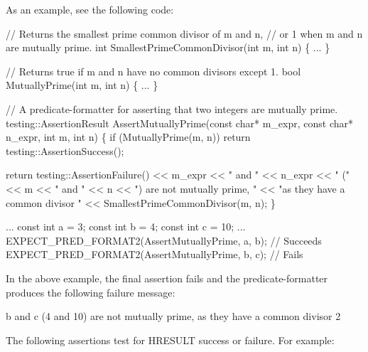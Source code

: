 As an example, see the following code\+:


\begin{DoxyCode}
\textcolor{comment}{// Returns the smallest prime common divisor of m and n,}
\textcolor{comment}{// or 1 when m and n are mutually prime.}
\textcolor{keywordtype}{int} SmallestPrimeCommonDivisor(\textcolor{keywordtype}{int} m, \textcolor{keywordtype}{int} n) \{ ... \}

\textcolor{comment}{// Returns true if m and n have no common divisors except 1.}
\textcolor{keywordtype}{bool} MutuallyPrime(\textcolor{keywordtype}{int} m, \textcolor{keywordtype}{int} n) \{ ... \}

\textcolor{comment}{// A predicate-formatter for asserting that two integers are mutually prime.}
testing::AssertionResult AssertMutuallyPrime(\textcolor{keyword}{const} \textcolor{keywordtype}{char}* m\_expr,
                                             \textcolor{keyword}{const} \textcolor{keywordtype}{char}* n\_expr,
                                             \textcolor{keywordtype}{int} m,
                                             \textcolor{keywordtype}{int} n) \{
  \textcolor{keywordflow}{if} (MutuallyPrime(m, n)) \textcolor{keywordflow}{return} testing::AssertionSuccess();

  \textcolor{keywordflow}{return} testing::AssertionFailure() << m\_expr << \textcolor{stringliteral}{" and "} << n\_expr
      << \textcolor{stringliteral}{" ("} << m << \textcolor{stringliteral}{" and "} << n << \textcolor{stringliteral}{") are not mutually prime, "}
      << \textcolor{stringliteral}{"as they have a common divisor "} << SmallestPrimeCommonDivisor(m, n);
\}

...
const \textcolor{keywordtype}{int} a = 3;
\textcolor{keyword}{const} \textcolor{keywordtype}{int} b = 4;
\textcolor{keyword}{const} \textcolor{keywordtype}{int} c = 10;
...
EXPECT\_PRED\_FORMAT2(AssertMutuallyPrime, a, b);  \textcolor{comment}{// Succeeds}
EXPECT\_PRED\_FORMAT2(AssertMutuallyPrime, b, c);  \textcolor{comment}{// Fails}
\end{DoxyCode}


In the above example, the final assertion fails and the predicate-\/formatter produces the following failure message\+:


\begin{DoxyCode}
b and c (4 and 10) are not mutually prime, as they have a common divisor 2
\end{DoxyCode}


The following assertions test for {\ttfamily H\+R\+E\+S\+U\+LT} success or failure. For example\+:



